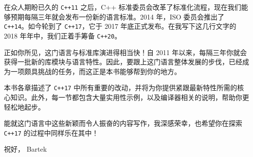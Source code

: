 在众人期盼已久的 \texttt{C++11} 之后，C++ 标准委员会改革了标准化流程，现在我们能够预期每隔三年就会发布一份新的语言标准。2014 年，ISO 委员会推出了 \texttt{C++14}。如今轮到了 \texttt{C++17}，它于 2017 年底正式发布。在我写下这几行文字的 2018 年年中，我们正着手筹备 \texttt{C++20}。

正如你所见，这门语言与标准库演进得相当快！自 2011 年以来，每隔三年你就会获得一批新的库模块与语言特性。因此，要跟上这门语言整体发展的步伐，已经成为一项颇具挑战的任务，而这正是本书能够帮到你的地方。

本书各章描述了 \texttt{C++17} 中所有重要的改动，并将为你提供紧跟最新特性所需的核心知识。此外，每一节都包含大量实用性示例，以及编译器相关的说明，帮助你更轻松地起步。

能就这门语言中这些新颖而令人振奋的内容写作，我深感荣幸，也希望你在探索 \texttt{C++17} 的过程中同样乐在其中！

祝好，
Bartek
